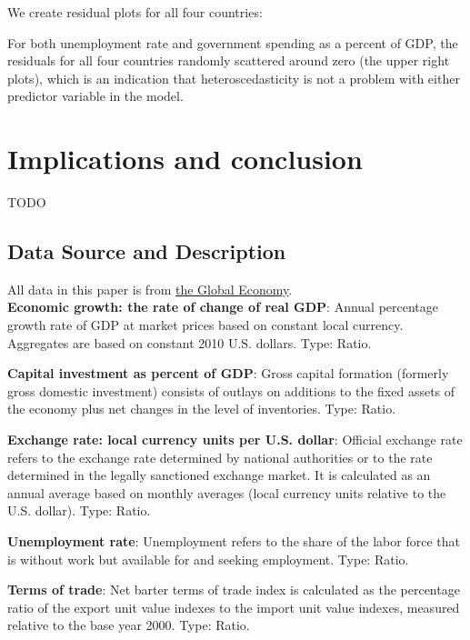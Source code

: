 \documentclass[11pt]{article}
\begin{document}
We create residual plots for all four countries:

For both unemployment rate and government spending as a percent of GDP, the residuals for all four countries randomly scattered around zero (the upper right plots), which is an indication that heteroscedasticity is not a problem with either predictor variable in the model\citep{Residual1}.

\section{Implications and conclusion}\label{conclusion}
TODO

\newpage



\begin{appendices}
\section{Data Source and Description}
All data in this paper is from \href{https://www.theglobaleconomy.com/download-data.php}{the Global Economy}.\\

\textbf{Economic growth: the rate of change of real GDP}: Annual percentage growth rate of GDP at market prices based on constant local currency. Aggregates are based on constant 2010 U.S. dollars. Type: Ratio.

\textbf{Capital investment as percent of GDP}: Gross capital formation (formerly gross domestic investment) consists of outlays on additions to the fixed assets of the economy plus net changes in the level of inventories. Type: Ratio.

\textbf{Exchange rate: local currency units per U.S. dollar}: Official exchange rate refers to the exchange rate determined by national authorities or to the rate determined in the legally sanctioned exchange market. It is calculated as an annual average based on monthly averages (local currency units relative to the U.S. dollar). Type: Ratio.

\textbf{Unemployment rate}: Unemployment refers to the share of the labor force that is without work but available for and seeking employment. Type: Ratio.

\textbf{Terms of trade}: Net barter terms of trade index is calculated as the percentage ratio of the export unit value indexes to the import unit value indexes, measured relative to the base year 2000. Type: Ratio.


\end{appendices}
\end{document}
